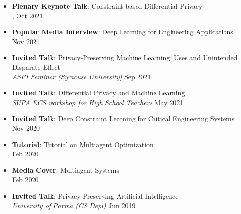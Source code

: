 \begin{itemize}
  \item \textbf{Plenary Keynote Talk}: Constraint-based Differential Privacy\\
  , 
  \hfill Oct 2021

  \item {\bf Popular Media Interview}: 
  {Deep Learning for Engineering Applications}\\ 
   \hfill {Nov 2021}

  \item \textbf{Invited Talk}: 
  Privacy-Preserving Machine Learning: Uses and Unintended Disparate Effect\\
  {\em ASPI Seminar (Syracuse University)} 
  \hfill Sep 2021
	
  \item \textbf{Invited Talk}: 
  Differential Privacy and Machine Learning\\
  {\em SUPA ECS workshop for High School Teachers}
  \hfill May 2021


  \item {\bf Invited Talk}: Deep Constraint Learning for Critical Engineering Systems\\
  \hfill {Nov 2020}

  \item {\bf Tutorial}: {Tutorial on Multiagent Optimization}\\ 
  \hfill {Feb 2020}

  \item {\bf Media Cover}: {Multiagent Systems} \\
   \hfill{Feb 2020}

  \item {\bf Invited Talk}: 
  Privacy-Preserving Artificial Intelligence\\
  {\em University of Parma (CS Dept)} 
  \hfill {Jun 2019}


\end{itemize}
